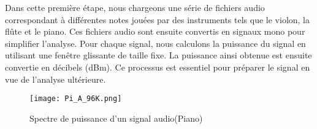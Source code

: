 Dans cette première étape, nous chargeons une série de fichiers audio correspondant à différentes notes jouées par des instruments tels que le violon, la flûte et le piano. Ces fichiers audio sont ensuite convertis en signaux mono pour simplifier l'analyse. Pour chaque signal, nous calculons la puissance du signal en utilisant une fenêtre glissante de taille fixe. La puissance ainsi obtenue est ensuite convertie en décibels (dBm). Ce processus est essentiel pour préparer le signal en vue de l'analyse ultérieure. 
\begin{figure}[htb]
    \centering
    \texttt{[image: Pi\_A\_96K.png]}
    \caption{Spectre de puissance d'un signal audio(Piano)}
    \label{fig:Power_Spectrum}
\end{figure}